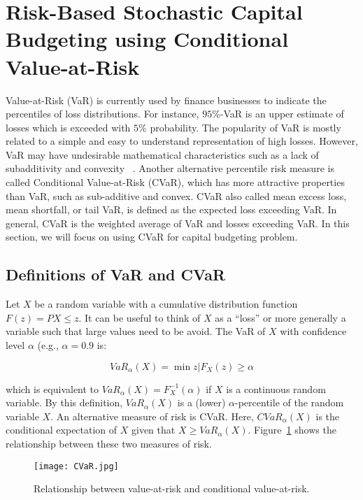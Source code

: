 \section{Risk-Based Stochastic Capital Budgeting using Conditional Value-at-Risk}
\label{sec:CVaR}

Value-at-Risk (VaR) is currently used by finance businesses to indicate the percentiles
of loss distributions. For instance, $95\%$-VaR is an upper estimate of losses which
is exceeded with $5\%$ probability. The popularity of VaR is mostly related to a simple
and easy to understand representation of high losses. However, VaR may have undesirable
mathematical characteristics such as a lack of subadditivity and convexity~\cite{ThinkingCoherently,CoherentMeasureRisk} .
Another alternative percentile risk measure is called Conditional Value-at-Risk (CVaR),
which has more attractive properties than VaR, such as sub-additive and convex.
CVaR also called mean excess loss, mean shortfall, or tail VaR, is defined as the
expected loss exceeding VaR. In general, CVaR is the weighted average of VaR and
losses exceeding VaR. In this section, we will focus on using CVaR for capital
budgeting problem.

\subsection{Definitions of VaR and CVaR}
\label{definitionCVaR}
Let $X$ be a random variable with a cumulative distribution function
$F(z) = P{X\le z}$. It can be useful to think of $X$ as a ``loss'' or more generally
a variable such that large values need to be avoid. The VaR of $X$ with confidence level
$\alpha$ (e.g., $\alpha = 0.9$ is:

\begin{equation}
VaR_\alpha (X) = \min {z|F_X(z)\ge \alpha}
\end{equation}

which is equivalent to $VaR_\alpha (X) = F_{X}^{-1}(\alpha)$ if $X$ is a continuous
random variable. By this definition, $VaR_\alpha (X)$ is a (lower) $\alpha$-percentile
of the random variable $X$. An alternative measure of risk is CVaR. Here, $CVaR_\alpha (X)$
is the conditional expectation of $X$ given that $X \ge VaR_\alpha (X)$.
Figure~\ref{fig:CVaR} shows the relationship between these two measures of risk.

\begin{figure}
    \centering
    \centerline{\texttt{[image: CVaR.jpg]}}
    \caption{Relationship between value-at-risk and conditional value-at-risk.}
    \label{fig:CVaR}
\end{figure}

